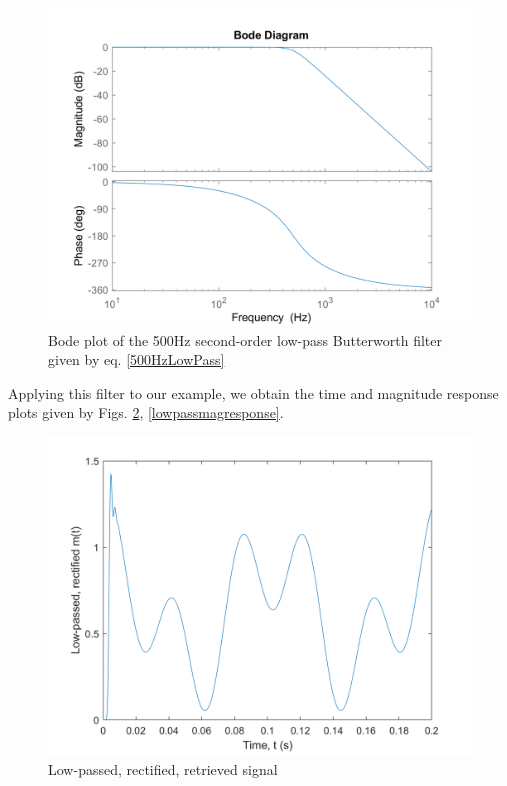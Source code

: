 \documentclass[journal]{IEEEtran}
\begin{document}
\begin{figure}[ht]
	\centering
 \includegraphics[width=\columnwidth]{500HzLPFBode.png}
    \caption{Bode plot of the 500Hz second-order low-pass Butterworth filter given by eq. \eqref{500HzLowPass}}
    \label{500HzLPFBode}
\end{figure}

Applying this filter to our example, we obtain the time and magnitude response plots given by Figs. \ref{lowpasstime}, \ref{lowpassmagresponse}.
\begin{figure}[ht]
	\centering
 \includegraphics[width=\columnwidth]{LowPassTime.png}
    \caption{Low-passed, rectified, retrieved signal}
    \label{lowpasstime}
\end{figure}
\end{document}
